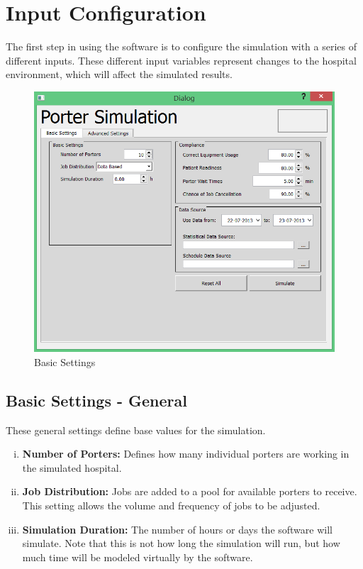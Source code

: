 \documentclass[paper=letter, fontsize=10pt]{scrartcl}
\numberwithin{equation}{section}		%
\numberwithin{figure}{section}			%
\numberwithin{table}{section}				%
\begin{document}
\section{Input Configuration}
The first step in using the software is to configure the simulation with a series of different inputs. These different input variables represent changes to the hospital environment, which will affect the simulated results.

	\begin{figure}[!htbp]
	\begin{center}
		\includegraphics[width=1\columnwidth, height=0.5\textheight, keepaspectratio]{BasicSettings.png}
		\caption{Basic Settings}
	\end{center}
	\end{figure} 
	\subsection{Basic Settings - General}
	These general settings define base values for the simulation.
	\begin{enumerate}[(i)]
		\item \textbf{Number of Porters:} Defines how many individual porters are working in the simulated hospital.
		\item \textbf{Job Distribution:} Jobs are added to a pool for available porters to receive. This setting allows the volume and frequency of jobs to be adjusted.
		\item \textbf{Simulation Duration:} The number of hours or days the software will simulate. Note that this is not how long the simulation will run, but how much time will be modeled virtually by the software. 
	\end{enumerate}
	
\end{document}
